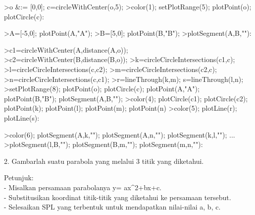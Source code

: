 \documentclass[12pt,arial,letterpaper]{book}
\begin{document}
\begin{eulernootebook}
\begin{eulercomment}
\begin{eulercomment}
\begin{eulernootebook}
\begin{eulercomment}
\begin{eulercomment}
\begin{eulercomment}
\begin{eulercomment}
\begin{eulercomment}
\begin{eulercomment}
\begin{eulernotebook}
\begin{eulercomment}
\begin{eulercomment}
\begin{eulercomment}
\begin{eulercomment}
\begin{eulercomment}
\begin{eulercomment}
\begin{eulercomment}
\end{eulercomment}
\eulersubheading{}
\begin{eulercomment}
\end{eulercomment}
\begin{eulerprompt}
>o &:= [0,0]; c=circleWithCenter(o,5);
>color(1); setPlotRange(5); plotPoint(o); plotCircle(c):
\end{eulerprompt}
\begin{eulerprompt}
>A=[-5,0]; plotPoint(A,"A");
>B=[5,0]; plotPoint(B,"B");
>plotSegment(A,B,""):
\end{eulerprompt}
\begin{eulerprompt}
>c1=circleWithCenter(A,distance(A,o));
>c2=circleWithCenter(B,distance(B,o));
>k=circleCircleIntersections(c1,c);
>l=circleCircleIntersections(c,c2);
>m=circleCircleIntersections(c2,c);
>n=circleCircleIntersections(c,c1);
>r=lineThrough(k,m); s=lineThrough(l,n);
>setPlotRange(8); plotPoint(o); plotCircle(c); plotPoint(A,"A"); plotPoint(B,"B"); plotSegment(A,B,"");
>color(4); plotCircle(c1); plotCircle(c2); plotPoint(k); plotPoint(l); plotPoint(m); plotPoint(n)
>color(5); plotLine(r); plotLine(s):
\end{eulerprompt}
\begin{eulerprompt}
>color(6); plotSegment(A,k,""); plotSegment(A,n,""); plotSegment(k,l,""); ...
>plotSegment(l,B,""); plotSegment(B,m,""); plotSegment(m,n,""):
\end{eulerprompt}
\begin{eulercomment}
2. Gambarlah suatu parabola yang melalui 3 titik yang diketahui.

Petunjuk:\\
- Misalkan persamaan parabolanya y= ax\textasciicircum{}2+bx+c.\\
- Substitusikan koordinat titik-titik yang diketahui ke persamaan
tersebut.\\
- Selesaikan SPL yang terbentuk untuk mendapatkan nilai-nilai a, b, c.


\end{eulercomment}
\end{eulercomment}
\end{eulercomment}
\end{eulercomment}
\end{eulercomment}
\end{eulercomment}
\end{eulercomment}
\end{eulernotebook}
\end{eulercomment}
\end{eulercomment}
\end{eulercomment}
\end{eulercomment}
\end{eulercomment}
\end{eulercomment}
\end{eulernootebook}
\end{eulercomment}
\end{eulercomment}
\end{eulernootebook}
\end{document}
